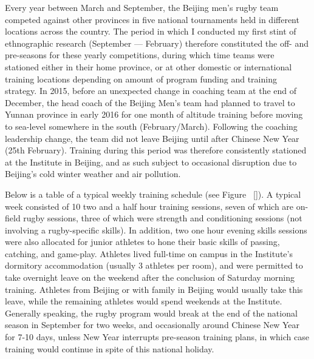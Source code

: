   Every year between March and September, the Beijing men's rugby team competed against other provinces in five national tournaments held in different locations across the country. The period in which I conducted my first stint of ethnographic research (September –-- February) therefore constituted the off- and pre-seasons for these yearly competitions, during which time teams were stationed either in their home province, or at other domestic or international training locations depending on amount of program funding and training strategy.  In 2015, before an unexpected change in coaching team at the end of December, the head coach of the Beijing Men's team had planned to travel to Yunnan province in early 2016 for one month of altitude training before moving to sea-level somewhere in the south (February/March).  Following the coaching leadership change, the team did not leave Beijing until after Chinese New Year (25th February). Training during this period was therefore consistently stationed at the Institute in Beijing, and as such subject to occasional disruption due to Beijing's cold winter weather and air pollution.

  Below is a table of a typical weekly training schedule (see Figure ~\ref{}). A typical week consisted of 10 two and a half hour training sessions, seven of which are on-field rugby sessions, three of which were strength and conditioning sessions (not involving a rugby-specific skills).  In addition, two one hour evening skills sessions were also allocated for junior athletes to hone their basic skills of passing, catching, and game-play.  Athletes lived full-time on campus in the Institute's dormitory accommodation (usually 3 athletes per room), and were permitted to take overnight leave on the weekend after the conclusion of Saturday morning training.  Athletes from Beijing or with family in Beijing would usually take this leave, while the remaining athletes would spend weekends at the Institute.  Generally speaking, the rugby program would break at the end of the national season in September for two weeks, and occasionally around Chinese New Year for 7-10 days, unless New Year interrupts pre-season training plans, in which case training would continue in spite of this national holiday.


